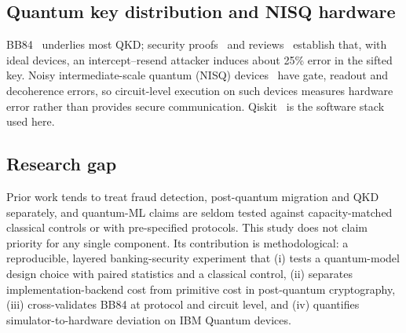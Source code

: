 \subsection{Quantum key distribution and NISQ hardware}
BB84~\cite{bb84} underlies most QKD; security proofs~\cite{shorpreskill} and reviews~\cite{gisin} establish that, with ideal devices, an intercept--resend attacker induces about 25\% error in the sifted key. Noisy intermediate-scale quantum (NISQ) devices~\cite{preskill} have gate, readout and decoherence errors, so circuit-level execution on such devices measures hardware error rather than provides secure communication. Qiskit~\cite{qiskit} is the software stack used here.

\subsection{Research gap}
Prior work tends to treat fraud detection, post-quantum migration and QKD separately, and quantum-ML claims are seldom tested against capacity-matched classical controls or with pre-specified protocols. This study does not claim priority for any single component. Its contribution is methodological: a reproducible, layered banking-security experiment that (i) tests a quantum-model design choice with paired statistics and a classical control, (ii) separates implementation-backend cost from primitive cost in post-quantum cryptography, (iii) cross-validates BB84 at protocol and circuit level, and (iv) quantifies simulator-to-hardware deviation on IBM Quantum devices.
